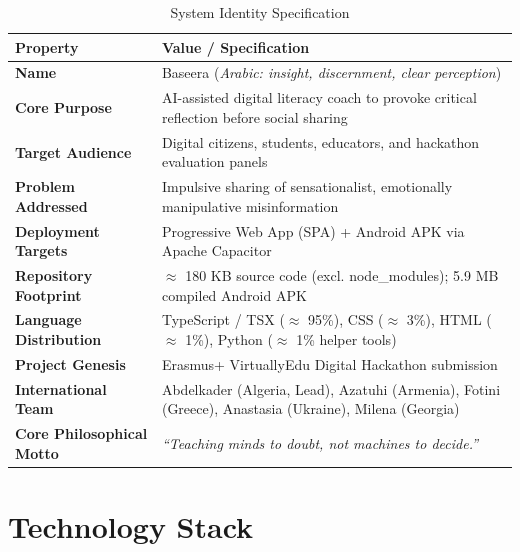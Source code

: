 \documentclass[10pt,a4paper]{report}
\begin{document}
\begin{table}[htbp]
\centering
\small
\caption{System Identity Specification}
\begin{tabularx}{\textwidth}{l X}
\toprule
\textbf{Property} & \textbf{Value / Specification} \\
\midrule
\textbf{Name} & Baseera (\textit{Arabic: insight, discernment, clear perception}) \\
\textbf{Core Purpose} & AI-assisted digital literacy coach to provoke critical reflection before social sharing \\
\textbf{Target Audience} & Digital citizens, students, educators, and hackathon evaluation panels \\
\textbf{Problem Addressed} & Impulsive sharing of sensationalist, emotionally manipulative misinformation \\
\textbf{Deployment Targets} & Progressive Web App (SPA) + Android APK via Apache Capacitor \\
\textbf{Repository Footprint} & $\approx$ 180 KB source code (excl. node\_modules); 5.9 MB compiled Android APK \\
\textbf{Language Distribution} & TypeScript / TSX ($\approx$ 95\%), CSS ($\approx$ 3\%), HTML ($\approx$ 1\%), Python ($\approx$ 1\% helper tools) \\
\textbf{Project Genesis} & Erasmus+ VirtuallyEdu Digital Hackathon submission \\
\textbf{International Team} & Abdelkader (Algeria, Lead), Azatuhi (Armenia), Fotini (Greece), Anastasia (Ukraine), Milena (Georgia) \\
\textbf{Core Philosophical Motto} & \textit{``Teaching minds to doubt, not machines to decide.''} \\
\bottomrule
\end{tabularx}
\end{table}

\chapter{Technology Stack}
\end{document}
